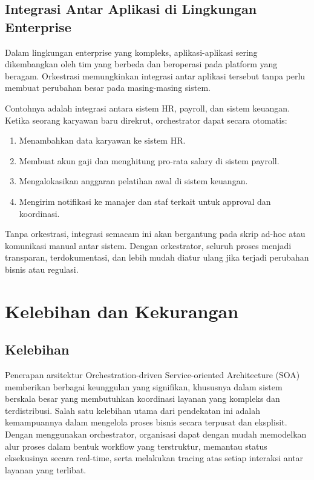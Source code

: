 \subsection{Integrasi Antar Aplikasi di Lingkungan Enterprise}

Dalam lingkungan enterprise yang kompleks, aplikasi-aplikasi sering dikembangkan oleh tim yang berbeda dan beroperasi pada platform yang beragam. Orkestrasi memungkinkan integrasi antar aplikasi tersebut tanpa perlu membuat perubahan besar pada masing-masing sistem.

Contohnya adalah integrasi antara sistem HR, payroll, dan sistem keuangan. Ketika seorang karyawan baru direkrut, orchestrator dapat secara otomatis:
\begin{enumerate}
	\item Menambahkan data karyawan ke sistem HR.
	\item Membuat akun gaji dan menghitung pro-rata salary di sistem payroll.
	\item Mengalokasikan anggaran pelatihan awal di sistem keuangan.
	\item Mengirim notifikasi ke manajer dan staf terkait untuk approval dan koordinasi.
\end{enumerate}

Tanpa orkestrasi, integrasi semacam ini akan bergantung pada skrip ad-hoc atau komunikasi manual antar sistem. Dengan orkestrator, seluruh proses menjadi transparan, terdokumentasi, dan lebih mudah diatur ulang jika terjadi perubahan bisnis atau regulasi.


\section{Kelebihan dan Kekurangan}

\subsection{Kelebihan}
Penerapan arsitektur Orchestration-driven Service-oriented Architecture (SOA) memberikan berbagai keunggulan yang signifikan, khususnya dalam sistem berskala besar yang membutuhkan koordinasi layanan yang kompleks dan terdistribusi. Salah satu kelebihan utama dari pendekatan ini adalah kemampuannya dalam mengelola proses bisnis secara terpusat dan eksplisit. Dengan menggunakan orchestrator, organisasi dapat dengan mudah memodelkan alur proses dalam bentuk workflow yang terstruktur, memantau status eksekusinya secara real-time, serta melakukan tracing atas setiap interaksi antar layanan yang terlibat.

